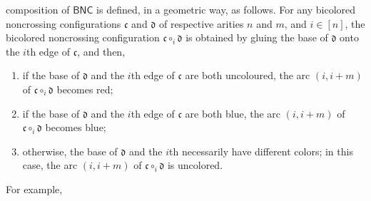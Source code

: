\documentclass[10pt,reqno]{amsart}
\numberwithin{equation}{subsection}
\newcommand{\Cfr}{\mathfrak{c}}
\newcommand{\Dfr}{\mathfrak{d}}
\newcommand{\BNC}{\mathsf{BNC}}
\begin{document}
composition of $\BNC$ is defined, in a geometric way, as follows. For
any bicolored noncrossing configurations $\Cfr$ and $\Dfr$ of respective
arities $n$ and $m$, and $i \in [n]$, the bicolored noncrossing
configuration $\Cfr \circ_i \Dfr$ is obtained by gluing the base of
$\Dfr$ onto the $i$th edge of $\Cfr$, and then,
\begin{enumerate}[fullwidth,label=(\alph*)]
    \item if the base of $\Dfr$ and the $i$th edge of $\Cfr$ are both
    uncoloured, the arc $(i, i + m)$ of $\Cfr \circ_i \Dfr$ becomes red;
    \item if the base of $\Dfr$ and the $i$th edge of $\Cfr$ are both
    blue, the arc $(i, i + m)$ of $\Cfr \circ_i \Dfr$ becomes blue;
    \item otherwise, the base of $\Dfr$ and the $i$th necessarily have
    different colors; in this case, the arc $(i, i + m)$ of
    $\Cfr \circ_i \Dfr$ is uncolored.
\end{enumerate}
For example,
\end{document}
